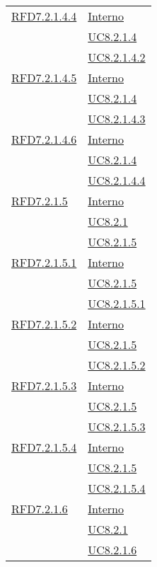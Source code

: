 \begin{longtable}{|>{\centering}m{5cm}|m{5cm}<{\centering}|}
\hyperlink{RFD7.2.1.4.4}{RFD7.2.1.4.4} & \hyperlink{Interno}{Interno}\\
& \hyperref[UC8.2.1.4]{UC8.2.1.4}\\
& \hyperref[UC8.2.1.4.2]{UC8.2.1.4.2}\\ \hline

\hyperlink{RFD7.2.1.4.5}{RFD7.2.1.4.5} & \hyperlink{Interno}{Interno}\\
& \hyperref[UC8.2.1.4]{UC8.2.1.4}\\
& \hyperref[UC8.2.1.4.3]{UC8.2.1.4.3}\\ \hline

\hyperlink{RFD7.2.1.4.6}{RFD7.2.1.4.6} & \hyperlink{Interno}{Interno}\\
& \hyperref[UC8.2.1.4]{UC8.2.1.4}\\
& \hyperref[UC8.2.1.4.4]{UC8.2.1.4.4}\\ \hline

\hyperlink{RFD7.2.1.5}{RFD7.2.1.5} & \hyperlink{Interno}{Interno}\\
& \hyperref[UC8.2.1]{UC8.2.1}\\
& \hyperref[UC8.2.1.5]{UC8.2.1.5}\\ \hline

\hyperlink{RFD7.2.1.5.1}{RFD7.2.1.5.1} & \hyperlink{Interno}{Interno}\\
& \hyperref[UC8.2.1.5]{UC8.2.1.5}\\
& \hyperref[UC8.2.1.5.1]{UC8.2.1.5.1}\\ \hline

\hyperlink{RFD7.2.1.5.2}{RFD7.2.1.5.2} & \hyperlink{Interno}{Interno}\\
& \hyperref[UC8.2.1.5]{UC8.2.1.5}\\
& \hyperref[UC8.2.1.5.2]{UC8.2.1.5.2}\\ \hline

\hyperlink{RFD7.2.1.5.3}{RFD7.2.1.5.3} & \hyperlink{Interno}{Interno}\\
& \hyperref[UC8.2.1.5]{UC8.2.1.5}\\
& \hyperref[UC8.2.1.5.3]{UC8.2.1.5.3}\\ \hline

\hyperlink{RFD7.2.1.5.4}{RFD7.2.1.5.4} & \hyperlink{Interno}{Interno}\\
& \hyperref[UC8.2.1.5]{UC8.2.1.5}\\
& \hyperref[UC8.2.1.5.4]{UC8.2.1.5.4}\\ \hline

\hyperlink{RFD7.2.1.6}{RFD7.2.1.6} & \hyperlink{Interno}{Interno}\\
& \hyperref[UC8.2.1]{UC8.2.1}\\
& \hyperref[UC8.2.1.6]{UC8.2.1.6}\\ \hline


\end{longtable}
